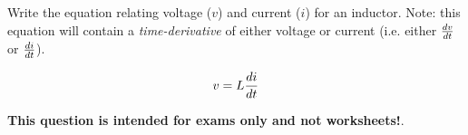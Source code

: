

Write the equation relating voltage ($v$) and current ($i$) for an inductor.  Note: this equation will contain a {\it time-derivative} of either voltage or current (i.e. either $dv \over dt$ or $di \over dt$).

\vskip 30pt







$$v = L {di \over dt}$$







{\bf This question is intended for exams only and not worksheets!}.




